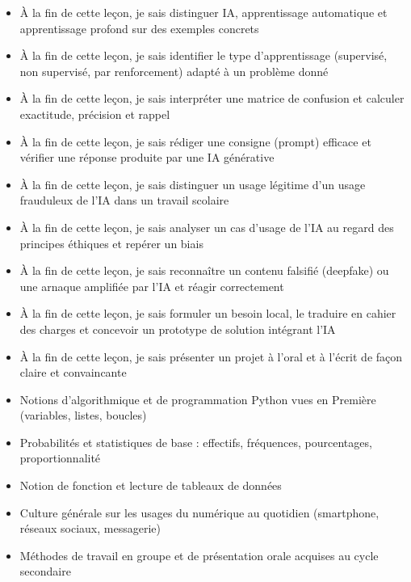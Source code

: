 \documentclass[11pt]{article}
\begin{document}
\begin{objectifs}
\begin{itemize}
\item À la fin de cette leçon, je sais distinguer IA, apprentissage automatique et apprentissage profond sur des exemples concrets
\item À la fin de cette leçon, je sais identifier le type d'apprentissage (supervisé, non supervisé, par renforcement) adapté à un problème donné
\item À la fin de cette leçon, je sais interpréter une matrice de confusion et calculer exactitude, précision et rappel
\item À la fin de cette leçon, je sais rédiger une consigne (prompt) efficace et vérifier une réponse produite par une IA générative
\item À la fin de cette leçon, je sais distinguer un usage légitime d'un usage frauduleux de l'IA dans un travail scolaire
\item À la fin de cette leçon, je sais analyser un cas d'usage de l'IA au regard des principes éthiques et repérer un biais
\item À la fin de cette leçon, je sais reconnaître un contenu falsifié (deepfake) ou une arnaque amplifiée par l'IA et réagir correctement
\item À la fin de cette leçon, je sais formuler un besoin local, le traduire en cahier des charges et concevoir un prototype de solution intégrant l'IA
\item À la fin de cette leçon, je sais présenter un projet à l'oral et à l'écrit de façon claire et convaincante
\end{itemize}
\end{objectifs}

\begin{prerequis}
\begin{itemize}
\item Notions d'algorithmique et de programmation Python vues en Première (variables, listes, boucles)
\item Probabilités et statistiques de base : effectifs, fréquences, pourcentages, proportionnalité
\item Notion de fonction et lecture de tableaux de données
\item Culture générale sur les usages du numérique au quotidien (smartphone, réseaux sociaux, messagerie)
\item Méthodes de travail en groupe et de présentation orale acquises au cycle secondaire
\end{itemize}
\end{prerequis}
\end{document}
